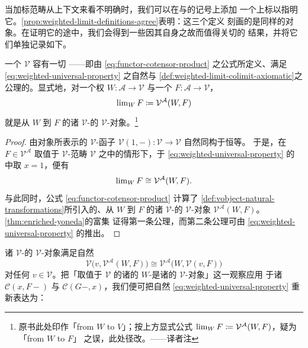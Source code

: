 当加标范畴从上下文来看不明确时，我们可以在\trWeightedLimit{}与\trWeightedColimit{}的记号上添加
一个上标以指明它。\cref{prop:weighted-limit-definitions-agree}表明：这三个定义
刻画的是同样的对象。在证明它的途中，我们会得到一些因其自身之故而值得关切的
结果，并将它们单独记录如下。

\begin{lemma}\label{lem:complete-v-admits-weighted-limits}
一个\trComplete{}\trCartesianClosed{}\trCategory{} $\mathcal{V}$ 容有一切%
\trWeightedLimit——即由 \eqref{eq:functor-cotensor-product} 之公式所定义、满足
\eqref{eq:weighted-universal-property} 之自然\trIsomorphism{}与%
\cref{def:weighted-limit-colimit-axiomatic}之公理的\trWeightedLimit。显式地，对一个权
$W\colon\mathcal{A}\to\mathcal{V}$ 与一个\trDiagram{}
$F\colon\mathcal{A}\to\mathcal{V}$，\trWeightedLimit
\[ \operatorname{lim}_{W}F\coloneqq\mathcal{V}^{\mathcal{A}}(W,F) \]
就是从 $W$ 到 $F$ 的诸 $\mathcal{V}$-\trNaturalTransformation{}的
$\mathcal{V}$-对象。\footnote{原书此处印作「from $W$ to $V$」；按上方显式公式
$\operatorname{lim}_{W}F\coloneqq\mathcal{V}^{\mathcal{A}}(W,F)$，疑为「from $W$ to $F$」
之误，此处径改。——译者注}
\end{lemma}

\begin{proof}
由\trTerminal{}对象所表示的 $\mathcal{V}$-函子
$\mathcal{V}(1,-)\colon\mathcal{V}\to\mathcal{V}$ 自然同构于恒等\trFunctor。
于是，在\trDiagram{} $F\in\mathcal{V}^{\mathcal{A}}$ 取值于 $\mathcal{V}$-范畴
$\mathcal{V}$ 之中的情形下，于 \eqref{eq:weighted-universal-property} 的%
\trUniversalProperty{}中取 $x=1$，便有
\[ \operatorname{lim}_{W}F\cong\mathcal{V}^{\mathcal{A}}(W,F). \]
与此同时，公式 \eqref{eq:functor-cotensor-product} 计算了%
\cref{def:vobject-natural-transformations}所引入的、从 $W$ 到 $F$ 的诸
$\mathcal{V}$-\trNaturalTransformation{}的 $\mathcal{V}$-对象
$\mathcal{V}^{\mathcal{A}}(W,F)$。\cref{thm:enriched-yoneda}的富集%
\trYonedaLemma{}证得第一条公理，而第二条公理可由
\eqref{eq:weighted-universal-property} 的\trUniversalProperty{}推出。
\end{proof}

诸 $\mathcal{V}$-\trNaturalTransformation{}的 $\mathcal{V}$-对象满足自然%
\trIsomorphism
\[ \mathcal{V}\bigl(v,\mathcal{V}^{\mathcal{A}}(W,F)\bigr)
   \cong\mathcal{V}^{\mathcal{A}}\bigl(W,\mathcal{V}(v,F)\bigr) \]
对任何 $v\in\mathcal{V}$。把「取值于 $\mathcal{V}$ 的诸\trFunctor{}的
$W$-\trWeightedLimit{}是诸\trNaturalTransformation{}的 $\mathcal{V}$-对象」这一观察应用
于诸\trFunctor{} $\mathcal{C}(x,F-)$ 与 $\mathcal{C}(G-,x)$，我们便可把自然%
\trIsomorphism{} \eqref{eq:weighted-universal-property} 重新表达为：

